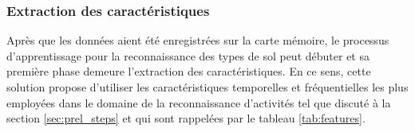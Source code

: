 \subsubsection{Extraction des caractéristiques}

Après que les données aient été enregistrées sur la carte mémoire, le processus d'apprentissage pour la reconnaissance des types de sol peut débuter et sa première phase demeure l'extraction des caractéristiques. En ce sens, cette solution propose d'utiliser les caractéristiques temporelles et fréquentielles les plus employées dans le domaine de la reconnaissance d'activités tel que discuté à la section \ref{sec:prel_steps} et qui sont rappelées par le tableau \ref{tab:features}.

\begin{table}[t!]
	\caption{Récapitulatif de toutes les caractéristiques utilisées par la solution proposée en fonction du nombre d'axes offerts par la centrale inertielle.}
	\label{tab:features}
\end{table}
